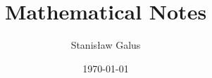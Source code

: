 \documentclass[a4paper,11pt]{report}
\title{Mathematical Notes}
\author{Stanis{\l}aw Galus}
\date{\today}
\theoremstyle{definition}
\numberwithin{prop}{section}
\begin{document}
\begingroup
\renewcommand{\thepage}{0}
\maketitle
\endgroup
\tableofcontents







\end{document}
